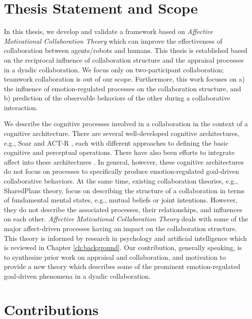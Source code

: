 \documentclass[12pt]{report}
\begin{document}
\section{Thesis Statement and Scope}

In this thesis, we develop and validate a framework based on \textit{Affective
Motivational Collaboration Theory} which can improve the effectiveness of
collaboration between agents/robots and humans. This thesis is established based
on the reciprocal influence of collaboration structure and the appraisal
processes in a dyadic collaboration. We focus only on two-participant
collaboration; teamwork collaboration is out of our scope. Furthermore, this
work focuses on a) the influence of emotion-regulated processes on the
collaboration structure, and b) prediction of the observable behaviors of the
other during a collaborative interaction.

We describe the cognitive processes involved in a collaboration in the context
of a cognitive architecture. There are several well-developed cognitive
architectures, e.g., Soar \cite{laird:soar} and ACT-R \cite{anderson:act-r},
each with different approaches to defining the basic cognitive and perceptual
operations. There have also been efforts to integrate affect into these
architectures \cite{dancy:actR-physiology-affect, marinier:behavior-emotion}. In
general, however, these cognitive architectures do not focus on processes to
specifically produce emotion-regulated goal-driven collaborative behaviors. At
the same time, existing collaboration theories, e.g., SharedPlans
\cite{grosz:plans-discourse} theory, focus on describing the structure of a
collaboration in terms of fundamental mental states, e.g., mutual beliefs or
joint intentions. However, they do not describe the associated processes, their
relationships, and influences on each other. \textit{Affective Motivational
Collaboration Theory} deals with some of the major affect-driven processes
having an impact on the collaboration structure. This theory is informed by
research in psychology and artificial intelligence which is reviewed in Chapter
\ref{ch:background}. Our contribution, generally speaking, is to synthesize
prior work on appraisal and collaboration, and motivation to provide a new
theory which describes some of the prominent emotion-regulated goal-driven
phenomena in a dyadic collaboration.

\section{Contributions}
\end{document}
